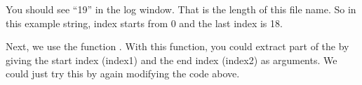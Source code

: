 You should see ``19'' in the log window. That is the length of this file name. So in this example string, index starts from 0 and the last index is 18.

Next, we use the function . With this function, you could extract part of the  by giving the start index (index1) and the end index (index2) as arguments. We could just try this by again modifying the code above.